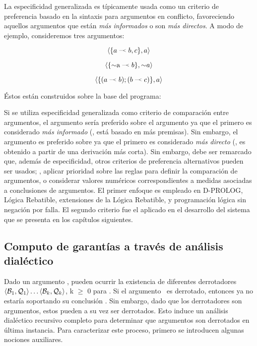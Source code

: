 La especificidad generalizada es típicamente usada como un criterio de preferencia basado en la sintaxis 
para argumentos en conflicto, favoreciendo aquellos argumentos que están \textit{más informados} o son 
\textit{más directos}. A modo de ejemplo, consideremos tres argumentos:

\begin{equation}\label{e:arg1}
\mbox{\AS{\drule{a}{b,c}}{a}}
\end{equation}

\begin{equation}\label{e:arg2}
\mbox{\AS{\drule{\no $a$}{b}}{\no a}}
\end{equation}

\begin{equation}\label{e:arg3}
\mbox{\AS{(\drule{a}{b});(\drule{b}{c})}{a}}
\end{equation}

Éstos están construidos sobre la base del programa:


Si se utiliza especificidad generalizada como criterio de comparación entre argumentos, el argumento 
 sería preferido sobre el argumento  ya que el primero es considerado \textit{más informado} (\ie, está basado en más premisas). Sin embargo, el argumento 
 es preferido sobre  ya que el primero es considerado \textit{más directo} (\ie, es obtenido a partir de una derivación más corta). Sin embargo, debe
ser remarcado que, además de especificidad, otros criterios de preferencia alternativos pueden ser usados; 
\eg, aplicar prioridad sobre las reglas para definir la comparación de argumentos, o considerar valores 
numéricos correspondientes a medidas asociadas a conclusiones de argumentos. El primer enfoque es empleado en
{\footnotesize D}-P{\footnotesize ROLOG}, Lógica Rebatible, extensiones de la Lógica Rebatible, y programación lógica sin negación por falla.
El segundo criterio fue el aplicado en el desarrollo del sistema que se presenta en los capítulos siguientes.

\subsection{Computo de garantías a través de análisis dialéctico}

Dado un argumento \AQ, pueden ocurrir la existencia de diferentes derrotadores $\mbox{$\langle \mbox{${\mathcal B_1}$},\mbox{${\mathcal Q_1}$} \rangle $}\ldots\mbox{$\langle \mbox{${\mathcal B_k}$},\mbox{${\mathcal Q_k}$} \rangle $}$, k $\ge$ 0 para
\AQ. Si el argumento \AQ\ es derrotado, entonces ya no estaría soportando su conclusión \ArgQ. 
Sin embargo, dado que los derrotadores son argumentos, estos pueden a su vez ser derrotados. Esto 
induce un análisis dialéctico recursivo completo para determinar que argumentos son derrotados en 
última instancia. Para caracterizar este proceso, primero se introducen algunas nociones auxiliares.

